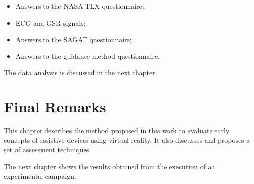 \begin{itemize}
    \item Answers to the NASA-TLX questionnaire;
    \item ECG and GSR signals;
    \item Answers to the SAGAT questionnaire;
    \item Answers to the guidance method questionnaire.
\end{itemize}

The data analysis is discussed in the next chapter.

\section{Final Remarks}

This chapter describes the method proposed in this work to evaluate early concepts of assistive devices using virtual reality. It also discusses and proposes a set of assessment techniques. 

The next chapter shows the results obtained from the execution of an experimental campaign.
